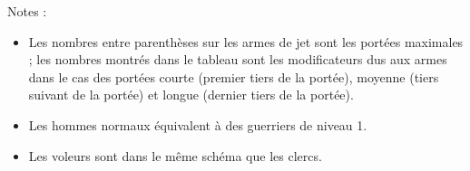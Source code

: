 \newpage

Notes :

\bigskip

\begin{itemize}
\item Les nombres entre parenthèses sur les armes de jet sont les portées maximales ; les nombres montrés dans le tableau sont les modificateurs dus aux armes dans le cas des portées courte (premier tiers de la portée), moyenne (tiers suivant de la portée) et longue (dernier tiers de la portée).
\item Les hommes normaux équivalent à des guerriers de niveau 1.
\item Les voleurs sont dans le même schéma que les clercs.
\end{itemize}

\bigskip

